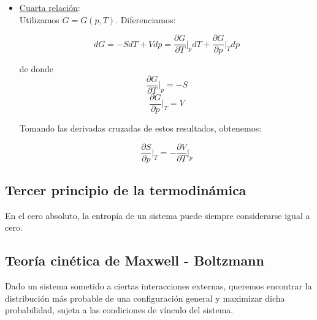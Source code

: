 \documentclass[a4paper]{article}
\begin{document}
\begin{itemize}
Para derivarla, utilizamos $F = F(T, V)$. Diferenciamos:

$$dF = -SdT - pdV = \frac{\partial F}{\partial T}\bigg|_{V}dT + \frac{\partial F}{\partial V}\bigg|_{T}dV$$

de donde $$\frac{\partial F}{\partial T}\bigg|_{V} = -S$$ $$\frac{\partial F}{\partial V}\bigg|_{T} = -p$$

Tomando las derivadas cruzadas de estos resultados, obtenemos:

\begin{equation}
\label{maxwell3}
\frac{\partial S}{\partial V}\bigg|_{T} = \frac{\partial p}{\partial T}\bigg|_{V}
\end{equation}

\item \underline{Cuarta relaci\'on}:\\

Utilizamos $G = G(p, T)$. Diferenciamos:

$$dG = -SdT + Vdp = \frac{\partial G}{\partial T}\bigg|_{p}dT + \frac{\partial G}{\partial p}\bigg|_{T}dp$$

de donde $$\frac{\partial G}{\partial T}\bigg|_{p} = -S$$ $$\frac{\partial G}{\partial p}\bigg|_{T} = V$$

Tomando las derivadas cruzadas de estos resultados, obtenemos:

\begin{equation}
\label{maxwell4}
\frac{\partial S}{\partial p}\bigg|_{T} = -\frac{\partial V}{\partial T}\bigg|_{p}
\end{equation}
\end{itemize}

\subsection{Tercer principio de la termodin\'amica}

En el cero absoluto, la entrop\'ia de un sistema puede siempre considerarse igual a cero.


\subsection{Teor\'ia cin\'etica de Maxwell - Boltzmann}

Dado un sistema sometido a ciertas interacciones externas, queremos encontrar la distribuci\'on m\'as probable de una configuraci\'on general y maximizar dicha probabilidad, sujeta a las condiciones de v\'inculo del sistema.\\
\end{document}

